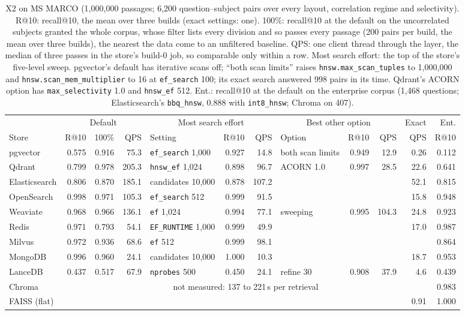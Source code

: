 \begin{table}[tbp]
\centering
\footnotesize
\setlength{\tabcolsep}{3.5pt}
\begin{tabular}{@{}lrrrlrrlrrrr@{}}
\toprule
 & \multicolumn{3}{c}{Default} & \multicolumn{3}{c}{Most search effort} & \multicolumn{3}{c}{Best other option} & Exact & Ent. \\
\cmidrule(lr){2-4}\cmidrule(lr){5-7}\cmidrule(lr){8-10}
Store & R@10 & 100\% & QPS & Setting & R@10 & QPS & Option & R@10 & QPS & QPS & R@10 \\
\midrule
pgvector & 0.575 & 0.916 & 75.3 & \texttt{ef\_search} 1,000 & 0.927 & 14.8 & both scan limits & 0.949 & 12.9 & 0.26 & 0.112 \\
Qdrant & 0.799 & 0.978 & 205.3 & \texttt{hnsw\_ef} 1,024 & 0.898 & 96.7 & ACORN 1.0 & 0.997 & 28.5 & 22.6 & 0.641 \\
Elasticsearch & 0.806 & 0.870 & 185.1 & candidates 10,000 & 0.878 & 107.2 & & & & 52.1 & 0.815 \\
OpenSearch & 0.998 & 0.971 & 105.3 & \texttt{ef\_search} 512 & 0.999 & 91.5 & & & & 15.8 & 0.948 \\
Weaviate & 0.968 & 0.966 & 136.1 & \texttt{ef} 1,024 & 0.994 & 77.1 & sweeping & 0.995 & 104.3 & 24.8 & 0.923 \\
Redis & 0.971 & 0.793 & 54.1 & \texttt{EF\_RUNTIME} 1,000 & 0.999 & 49.9 & & & & 17.0 & 0.987 \\
Milvus & 0.972 & 0.936 & 68.6 & \texttt{ef} 512 & 0.999 & 98.1 & & & & & 0.864 \\
MongoDB & 0.996 & 0.960 & 24.1 & candidates 10,000 & 1.000 & 10.3 & & & & 18.7 & 0.953 \\
LanceDB & 0.437 & 0.517 & 67.9 & \texttt{nprobes} 500 & 0.450 & 24.1 & refine 30 & 0.908 & 37.9 & 4.6 & 0.439 \\
Chroma & \multicolumn{10}{c}{not measured: 137 to 221\,s per retrieval} & 0.983 \\
FAISS (flat) & & & & & & & & & & 0.91 & 1.000 \\
\bottomrule
\end{tabular}
\caption{X2 on MS MARCO (1,000,000 passages; 6,200 question--subject pairs over every layout,
correlation regime and selectivity). R@10: recall@10, the mean over three builds (exact settings:
one). 100\%: recall@10 at the default on the uncorrelated subjects granted the whole corpus, whose
filter lists every division and so passes every passage (200 pairs per build, the mean over three
builds), the nearest the data come to an unfiltered baseline. QPS: one client thread through the
layer, the median of three passes in the store's build-0
job, so comparable only within a row. Most search effort: the top of the store's five-level sweep.
pgvector's default has iterative scans off; ``both scan limits'' raises \texttt{hnsw.max\_scan\_tuples}
to 1,000,000 and \texttt{hnsw.scan\_mem\_multiplier} to 16 at \texttt{ef\_search} 100; its exact
search answered 998 pairs in its time. Qdrant's ACORN option has \texttt{max\_selectivity} 1.0 and
\texttt{hnsw\_ef} 512. Ent.: recall@10 at the default on the enterprise corpus (1,468 questions;
Elasticsearch's \texttt{bbq\_hnsw}, 0.888 with \texttt{int8\_hnsw}; Chroma on 407).}
\label{tab:qual-frontiers}
\end{table}

